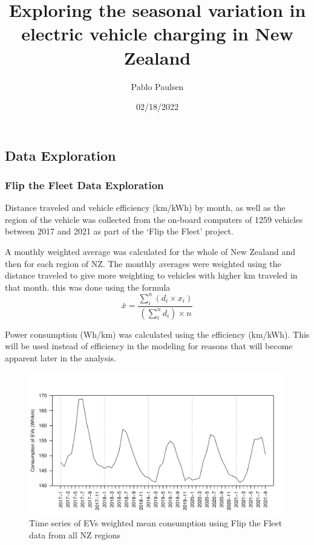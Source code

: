 \documentclass[
]{article}
\title{Exploring the seasonal variation in electric vehicle charging in
New Zealand}
\author{Pablo Paulsen}
\date{02/18/2022}
\begin{document}
\maketitle

\hypertarget{data-exploration}{%
\subsection{Data Exploration}\label{data-exploration}}

\hypertarget{flip-the-fleet-data-exploration}{%
\subsubsection{Flip the Fleet Data
Exploration}\label{flip-the-fleet-data-exploration}}

Distance traveled and vehicle efficiency (km/kWh) by month, as well as
the region of the vehicle was collected from the on-board computers of
1259 vehicles between 2017 and 2021 as part of the `Flip the Fleet'
project.

A monthly weighted average was calculated for the whole of New Zealand
and then for each region of NZ. The monthly averages were weighted using
the distance traveled to give more weighting to vehicles with higher km
traveled in that month. this was done using the formula
\[\bar{x} = \frac{\sum_{i}^{n} (d_i\times x_i)}{\left(\sum_{i}^{n} d_i\right)\times n}\]

Power consumption (Wh/km) was calculated using the efficiency (km/kWh).
This will be used instead of efficiency in the modeling for reasons that
will become apparent later in the analysis.

\begin{figure}
\centering
\includegraphics{final_report_files/figure-latex/consum_plot-1.pdf}
\caption{Time series of EVs weighted mean consumption using Flip the
Fleet data from all NZ regions\label{fig:consum_plot}}
\end{figure}
\end{document}
